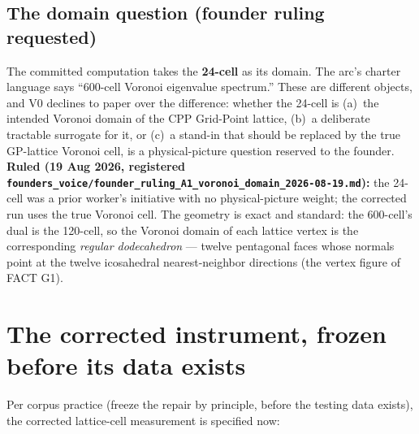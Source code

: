 \documentclass[12pt]{article}
\begin{document}
\subsection{The domain question (founder ruling requested)}
\label{sec:domain}

The committed computation takes the \textbf{24-cell} as its domain.
The arc's charter language says ``600-cell Voronoi eigenvalue
spectrum.''  These are different objects, and V0 declines to paper over
the difference: whether the 24-cell is (a)~the intended Voronoi domain
of the CPP Grid-Point lattice, (b)~a deliberate tractable surrogate for
it, or (c)~a stand-in that should be replaced by the true GP-lattice
Voronoi cell, is a physical-picture question reserved to the founder.
\textbf{Ruled (19 Aug 2026, registered
\texttt{founders\_voice/founder\_ruling\_A1\_voronoi\_domain\_2026-08-19.md}):}
the 24-cell was a prior worker's initiative with no physical-picture
weight; the corrected run uses the true Voronoi cell.  The geometry is
exact and standard: the 600-cell's dual is the 120-cell, so the Voronoi
domain of each lattice vertex is the corresponding \emph{regular
dodecahedron} --- twelve pentagonal faces whose normals point at the
twelve icosahedral nearest-neighbor directions (the vertex figure of
FACT G1).

\section{The corrected instrument, frozen before its data exists}
\label{sec:corrected}

Per corpus practice (freeze the repair by principle, before the testing
data exists), the corrected lattice-cell measurement is specified now:
\end{document}
